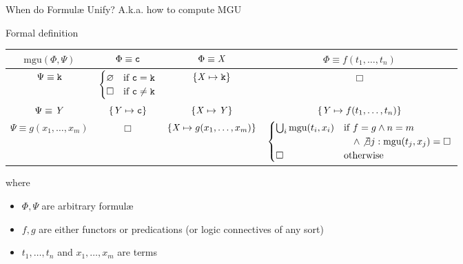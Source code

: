 \documentclass[presentation]{beamer}\mode<presentation>{\usetheme{AMSBolognaFC}}
\begin{document}
\begin{frame}{When do Formul\ae{} Unify? A.k.a. how to compute MGU} 
    \begin{block}{Formal definition}
        \begin{adjustbox}{width=\textwidth} 
            \begin{tabular}{c||c|c|c}
                $\text{mgu}(\Phi,\Psi)$ & $\Phi \equiv \mathtt{c}$ & $\Phi \equiv \mathit{X}$ & $\Phi \equiv f(t_1, \ldots, t_n)$
                \\
                \hline\hline
                $\Psi \equiv \mathtt{k}$ & $\begin{cases} \varnothing & \text{if} ~ \mathtt{c} = \mathtt{k} \\ \Box & \text{if} ~ \mathtt{c} \neq \mathtt{k} \end{cases} $ & $\{\mathit{X} \mapsto \mathtt{k}\}$ & $\Box$
                \\
                \hline
                $\Psi \equiv \mathit{Y}$ & $\{\mathit{Y} \mapsto \mathtt{c}\}$ & $\{\mathit{X} \mapsto \mathit{Y}\}$ & $\{\mathit{Y} \mapsto f(t_1, \ldots, t_n)\}$
                \\
                \hline
                $\Psi \equiv g(x_1, \ldots, x_m)$ & $\Box$ & $\{\mathit{X} \mapsto g(x_1, \ldots, x_m)\}$ & $\begin{cases} \bigcup_i \text{mgu}(t_i, x_i) & \text{if} ~ f = g \wedge n = m \\ & \quad \wedge \not\exists j : \text{mgu}(t_j, x_j) = \Box \\ \Box & \text{otherwise} \end{cases}$
            \end{tabular}
        \end{adjustbox}
        where
        \begin{itemize}\small
            \item $\Phi, \Psi$ are arbitrary formul\ae{}
            \item $f, g$ are either functors or predications (or logic connectives of any sort)
            \item $t_1, \ldots, t_n$ and $x_1, \ldots, x_m$ are terms
        \end{itemize}
    \end{block}
\end{frame}
\end{document}
